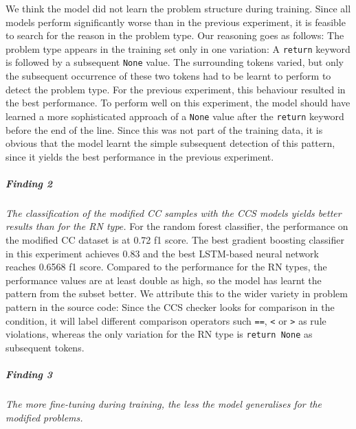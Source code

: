 We think the model did not learn the problem structure during training. Since all models perform significantly worse than in the previous experiment, it is feasible to search for the reason in the problem type. Our reasoning goes as follows:
The problem type appears in the training set only in one variation: A \texttt{return} keyword is followed by a subsequent \texttt{None} value. The surrounding tokens varied, but only the subsequent occurrence of these two tokens had to be learnt to perform to detect the problem type. For the previous experiment, this behaviour resulted in the best performance. To perform well on this experiment, the model should have learned a more sophisticated approach of a \texttt{None} value after the \texttt{return} keyword before the end of the line. Since this was not part of the training data, it is obvious that the model learnt the simple subsequent detection of this pattern, since it yields the best performance in the previous experiment.

\subparagraph{Finding 2}\label{finding:ccs_more_variety}
\textit{The classification of the modified CC samples with the CCS models yields better results than for the RN type.}
For the random forest classifier, the performance on the modified CC dataset is at 0.72 f1 score. The best gradient boosting classifier in this experiment achieves 0.83 and the best LSTM-based neural network reaches 0.6568 f1 score. 
Compared to the performance for the RN types, the performance values are at least double as high, so the model has learnt the pattern from the subset better. We attribute this to the wider variety in problem pattern in the source code: Since the CCS checker looks for comparison in the condition, it will label different comparison operators such \texttt{==}, \texttt{<} or \texttt{>} as rule violations, whereas the only variation for the RN type is \texttt{return None} as subsequent tokens.

\subparagraph{Finding 3}\label{finding:better_vs_worse}
\textit{The more fine-tuning during training, the less the model generalises for the modified problems.}

